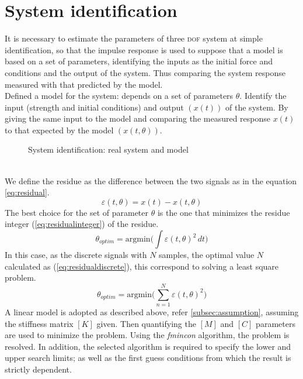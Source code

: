 \section{System identification}
\label{sec:sysidentification}
It is necessary to estimate the parameters of three \textsc{dof} system at simple 
identification, so that the impulse response is used to suppose that a model is 
based on a set of parameters, identifying the inputs as the initial force and 
conditions and the output of the system.
Thus comparing the system response measured with that predicted by the model.\\
Defined a model for the system: depends on a set of parameters $\theta$. 
Identify the input (strength and initial conditions) and output $(x(t))$ of the system. 
By giving the same input to the model and comparing the measured response $x(t)$ 
to that expected by the model $(x(t,\theta))$.
%
\begin{figure}[htb]
	\centering
	\resizebox{.50\linewidth}{!}{}
	\label{fig:systemmodel}
	\caption{System identification: real system and model}
\end{figure}
%
\\We define the residue as the difference between the two signals as in the 
equation \eqref{eq:residual}.
\begin{equation}
\label{eq:residual}
	\varepsilon(t,\theta) = x(t) - x(t,\theta)
\end{equation} 
The best choice for the set of parameter $\theta$ is the one that minimizes the 
residue integer (\ref{eq:residualinteger}) of the residue. 
\begin{equation}
\label{eq:residualinteger}
	\theta_{optim} = \text{argmin} \biggl( \int \varepsilon(t,\theta)^2 \, dt \biggr)
\end{equation} 
In this case, as the discrete signals with $N$ samples, the optimal value $N$ 
calculated as (\ref{eq:residualdiscrete}), this correspond to solving a least 
square problem.
\begin{equation}
\label{eq:residualdiscrete} 
\theta_{optim} = \text{argmin} \Biggl( \sum_{n=1}^{N} \varepsilon(t,\theta)^2 \Biggr)
\end{equation}
%
A linear model is adopted as described above, refer \ref{subsec:assumption}, 
assuming the stiffness matrix $[K]$ given.
Then quantifying the $[M]$ and $[C]$ parameters are used to minimize the problem.
Using the \emph{fmincon} algorithm, the problem is resolved. In addition, the 
selected algorithm is required to specify the lower and upper search limits; 
as well as the first guess conditions from which the result is strictly dependent.
%

